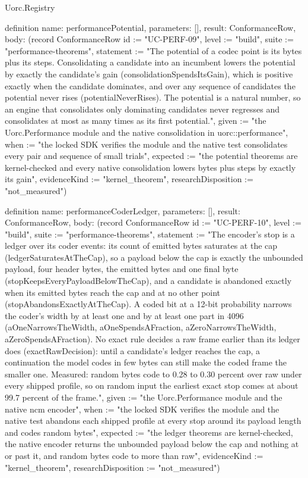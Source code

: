 \begin{lexlean}{Uorc.Registry}
\begin{semanticmodule}
definition{
  name: performancePotential,
  parameters: [],
  result: ConformanceRow,
  body: (record ConformanceRow {id := "UC-PERF-09", level := "build", suite := "performance-theorems", statement := "The potential of a codec point is its bytes plus its steps. Consolidating a candidate into an incumbent lowers the potential by exactly the candidate's gain (consolidationSpendsItsGain), which is positive exactly when the candidate dominates, and over any sequence of candidates the potential never rises (potentialNeverRises). The potential is a natural number, so an engine that consolidates only dominating candidates never regresses and consolidates at most as many times as its first potential.", given := "the Uorc.Performance module and the native consolidation in uorc::performance", when := "the locked SDK verifies the module and the native test consolidates every pair and sequence of small trials", expected := "the potential theorems are kernel-checked and every native consolidation lowers bytes plus steps by exactly its gain", evidenceKind := "kernel_theorem", researchDisposition := "not_measured"})
}

definition{
  name: performanceCoderLedger,
  parameters: [],
  result: ConformanceRow,
  body: (record ConformanceRow {id := "UC-PERF-10", level := "build", suite := "performance-theorems", statement := "The encoder's stop is a ledger over its coder events: its count of emitted bytes saturates at the cap (ledgerSaturatesAtTheCap), so a payload below the cap is exactly the unbounded payload, four header bytes, the emitted bytes and one final byte (stopKeepsEveryPayloadBelowTheCap), and a candidate is abandoned exactly when its emitted bytes reach the cap and at no other point (stopAbandonsExactlyAtTheCap). A coded bit at a 12-bit probability narrows the coder's width by at least one and by at least one part in 4096 (aOneNarrowsTheWidth, aOneSpendsAFraction, aZeroNarrowsTheWidth, aZeroSpendsAFraction). No exact rule decides a raw frame earlier than its ledger does (exactRawDecision): until a candidate's ledger reaches the cap, a continuation the model codes in few bytes can still make the coded frame the smaller one. Measured: random bytes code to 0.28 to 0.30 percent over raw under every shipped profile, so on random input the earliest exact stop comes at about 99.7 percent of the frame.", given := "the Uorc.Performance module and the native ncm encoder", when := "the locked SDK verifies the module and the native test abandons each shipped profile at every stop around its payload length and codes random bytes", expected := "the ledger theorems are kernel-checked, the native encoder returns the unbounded payload below the cap and nothing at or past it, and random bytes code to more than raw", evidenceKind := "kernel_theorem", researchDisposition := "not_measured"})
}


\end{semanticmodule}
\end{lexlean}
